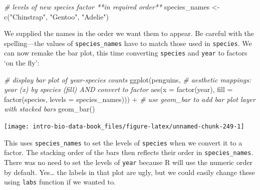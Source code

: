 \documentclass[
]{book}
\newenvironment{Shaded}{\begin{snugshade}}{\end{snugshade}}
\newcommand{\AttributeTok}[1]{\textcolor[rgb]{0.77,0.63,0.00}{#1}}
\newcommand{\CommentTok}[1]{\textcolor[rgb]{0.56,0.35,0.01}{\textit{#1}}}
\newcommand{\FunctionTok}[1]{\textcolor[rgb]{0.00,0.00,0.00}{#1}}
\newcommand{\NormalTok}[1]{#1}
\newcommand{\OtherTok}[1]{\textcolor[rgb]{0.56,0.35,0.01}{#1}}
\newcommand{\SpecialCharTok}[1]{\textcolor[rgb]{0.00,0.00,0.00}{#1}}
\newcommand{\StringTok}[1]{\textcolor[rgb]{0.31,0.60,0.02}{#1}}
\begin{document}
\begin{Shaded}
\begin{Highlighting}[]
\CommentTok{\# levels of new species factor **in required order**}
\NormalTok{species\_names }\OtherTok{\textless{}{-}} \FunctionTok{c}\NormalTok{(}\StringTok{"Chinstrap"}\NormalTok{, }\StringTok{"Gentoo"}\NormalTok{, }\StringTok{"Adelie"}\NormalTok{)}
\end{Highlighting}
\end{Shaded}

We supplied the names in the order we want them to appear. Be careful with the spelling---the values of \texttt{species\_names} have to match those used in \texttt{species}. We can now remake the bar plot, this time converting \texttt{species} and \texttt{year} to factors `on the fly':

\begin{Shaded}
\begin{Highlighting}[]
\CommentTok{\# display bar plot of year{-}species counts}
\FunctionTok{ggplot}\NormalTok{(penguins, }
       \CommentTok{\# aesthetic mappings: year (x) by species (fill) AND convert to factor}
       \FunctionTok{aes}\NormalTok{(}\AttributeTok{x =} \FunctionTok{factor}\NormalTok{(year), }\AttributeTok{fill =} \FunctionTok{factor}\NormalTok{(species, }\AttributeTok{levels =}\NormalTok{ species\_names))) }\SpecialCharTok{+}
  \CommentTok{\# use geom\_bar to add bar plot layer with stacked bars}
  \FunctionTok{geom\_bar}\NormalTok{()}
\end{Highlighting}
\end{Shaded}

\begin{center}\texttt{[image: intro-bio-data-book\_files/figure-latex/unnamed-chunk-249-1]} \end{center}

This uses \texttt{species\_names} to set the levels of \texttt{species} when we convert it to a factor. The stacking order of the bars then reflects their order in \texttt{species\_names}. There was no need to set the levels of \texttt{year} because R will use the numeric order by default. Yes\ldots{} the labels in that plot are ugly, but we could easily change these using \texttt{labs} function if we wanted to.
\end{document}
